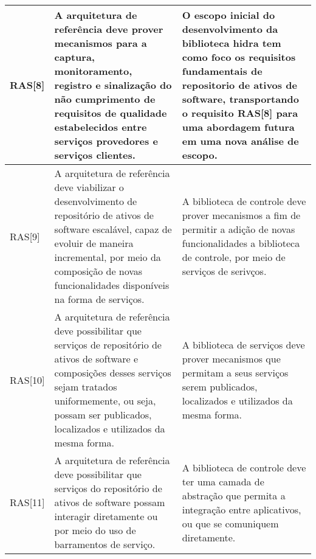 \begin{longtable}{ | l | p{6cm} | p{6cm} |}
RAS[8] & 
A arquitetura de referência deve prover mecanismos para a  captura, monitoramento, registro e sinalização do não  cumprimento de requisitos de qualidade estabelecidos entre  serviços provedores e serviços clientes. & O escopo inicial do desenvolvimento da biblioteca hidra tem como foco os requisitos fundamentais de repositorio de ativos de software, transportando o requisito RAS[8] para uma abordagem futura em uma nova análise de escopo.
 \\ \hline 

RAS[9] & 
A arquitetura de referência deve viabilizar o desenvolvimento
de repositório de ativos de software escalável, capaz de evoluir 
de maneira incremental, por meio da composição de novas 
funcionalidades disponíveis na forma de serviços. & A biblioteca de controle deve prover mecanismos a fim de permitir a adição de novas funcionalidades a biblioteca de controle, por meio de serviços de serivços.
 \\ \hline 
 RAS[10] & 
A arquitetura de referência deve possibilitar que serviços de  repositório de ativos de software e composições desses  serviços sejam tratados uniformemente, ou seja, possam ser  publicados, localizados e utilizados da mesma forma. & A biblioteca de serviços deve prover mecanismos que permitam a seus serviços serem publicados, localizados e utilizados da mesma forma.
 \\ \hline 
 
 RAS[11] & 

A arquitetura de referência deve possibilitar que serviços do  repositório de ativos de software possam interagir diretamente  ou por meio do uso de barramentos de serviço. & 
A biblioteca de controle deve ter uma camada de abstração que permita a integração entre aplicativos, ou que se comuniquem diretamente.

 \\ \hline 

\end{longtable}
